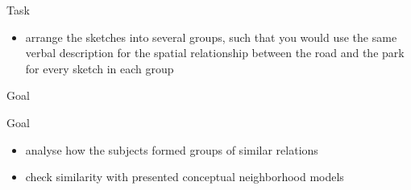 \begin{frame}{Task}
	\begin{itemize}
		\item arrange the sketches into several groups, such that you would use the same verbal description for the spatial relationship between the road and the park for every sketch in each group
	\end{itemize}
\end{frame}

\begin{frame}{Goal}
	\begin{block}{Goal}
		\begin{itemize}
			\item analyse how the subjects formed groups of similar relations
			\item check similarity with presented conceptual neighborhood models
		\end{itemize}
	\end{block}
\end{frame}

